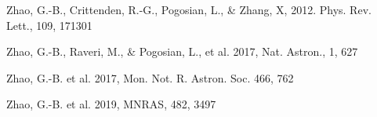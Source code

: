 \documentclass[twocolumn]{aastex61}
\begin{document}
\begin{thebibliography}{}

Zhao, G.-B., Crittenden, R.-G., Pogosian, L., \& Zhang, X, 2012. Phys. Rev. Lett., 109, 171301

Zhao, G.-B., Raveri, M., \& Pogosian, L., et al. 2017, Nat. Astron., 1, 627

Zhao, G.-B. et al. 2017, Mon. Not. R. Astron. Soc. 466, 762

Zhao, G.-B. et al. 2019, MNRAS, 482, 3497










\end{thebibliography}
\end{document}
